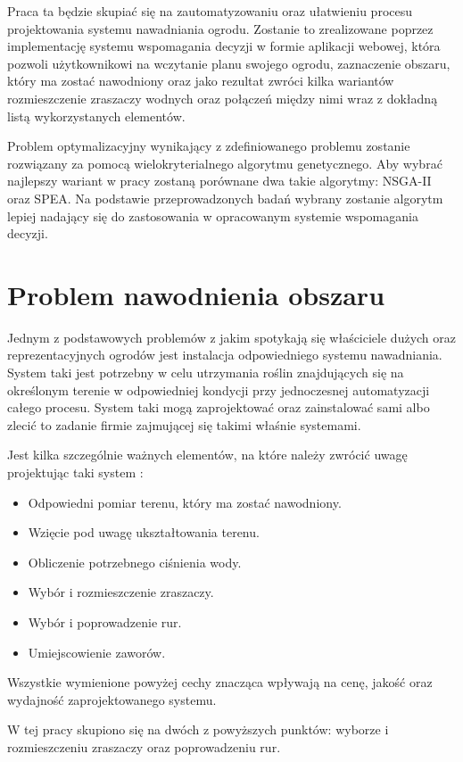\documentclass[twoside]{iisthesis}
\begin{document}
Praca ta będzie skupiać się na zautomatyzowaniu oraz ułatwieniu procesu projektowania systemu nawadniania ogrodu. Zostanie to zrealizowane poprzez implementację systemu wspomagania decyzji w formie aplikacji webowej, która pozwoli użytkownikowi na wczytanie planu swojego ogrodu, zaznaczenie obszaru, który ma zostać nawodniony oraz jako rezultat zwróci kilka wariantów rozmieszczenie zraszaczy wodnych oraz połączeń między nimi wraz z dokładną listą wykorzystanych elementów.

Problem optymalizacyjny wynikający z zdefiniowanego problemu zostanie rozwiązany za pomocą wielokryterialnego algorytmu genetycznego. Aby wybrać najlepszy wariant w pracy zostaną porównane dwa takie algorytmy: NSGA-II oraz SPEA. Na podstawie przeprowadzonych badań wybrany zostanie algorytm lepiej nadający się do zastosowania w opracowanym systemie wspomagania decyzji.
\section{Problem nawodnienia obszaru}
Jednym z podstawowych problemów z jakim spotykają się właściciele dużych oraz reprezentacyjnych ogrodów jest instalacja odpowiedniego systemu nawadniania. System taki jest potrzebny w celu utrzymania roślin znajdujących się na określonym terenie w odpowiedniej kondycji przy jednoczesnej automatyzacji całego procesu. System taki mogą zaprojektować oraz zainstalować sami albo zlecić to zadanie firmie zajmującej się takimi właśnie systemami.

Jest kilka szczególnie ważnych elementów, na które należy zwrócić uwagę projektując taki system \cite{irrigation_plan}:\\
\begin{itemize}
	\item Odpowiedni pomiar terenu, który ma zostać nawodniony.
	\item Wzięcie pod uwagę ukształtowania terenu.
	\item Obliczenie potrzebnego ciśnienia wody.
	\item Wybór i rozmieszczenie zraszaczy.
	\item Wybór i poprowadzenie rur.
	\item Umiejscowienie zaworów.\\
\end{itemize}
Wszystkie wymienione powyżej cechy znacząca wpływają na cenę, jakość oraz wydajność zaprojektowanego systemu.

W tej pracy skupiono się na dwóch z powyższych punktów: wyborze i rozmieszczeniu zraszaczy oraz poprowadzeniu rur.
\end{document}
